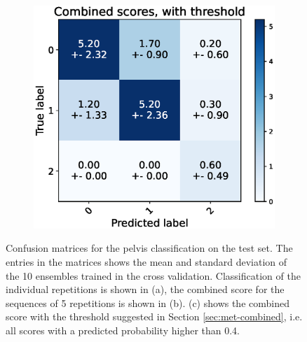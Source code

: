 \begin{figure}
  \begin{subfigure}[t]{0.48\textwidth}
      \includegraphics[width=\textwidth]{files/figs/res/pelvis/cnf-combined-th.eps}
      \caption{}
      \label{fig:pelvis-cnf-comb-th}
  \end{subfigure}
  \caption{Confusion matrices for the pelvis classification on the test set. The entries in the matrices shows the mean and standard deviation of the 10 ensembles trained in the cross validation. Classification of the individual repetitions is shown in (a), the combined score for the sequences of 5 repetitions is shown in (b). (c) shows the combined score with the threshold suggested in Section \ref{sec:met-combined}, i.e. all scores with a predicted probability higher than 0.4.}
  \label{fig:pelvis-cnfs}
\end{figure}

